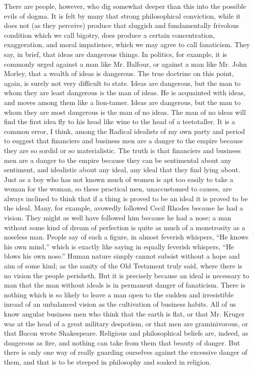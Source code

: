 There are people, however, who dig somewhat deeper than this into the possible evils of dogma. It is felt by many that strong philosophical conviction, while it does not (as they perceive) produce that sluggish and fundamentally frivolous condition which we call bigotry, does produce a certain concentration, exaggeration, and moral impatience, which we may agree to call fanaticism. They say, in brief, that ideas are dangerous things. In politics, for example, it is commonly urged against a man like Mr. Balfour, or against a man like Mr. John Morley, that a wealth of ideas is dangerous. The true doctrine on this point, again, is surely not very difficult to state. Ideas are dangerous, but the man to whom they are least dangerous is the man of ideas. He is acquainted with ideas, and moves among them like a lion-tamer. Ideas are dangerous, but the man to whom they are most dangerous is the man of no ideas. The man of no ideas will find the first idea fly to his head like wine to the head of a teetotaller. It is a common error, I think, among the Radical idealists of my own party and period to suggest that financiers and business men are a danger to the empire because they are so sordid or so materialistic. The truth is that financiers and business men are a danger to the empire because they can be sentimental about any sentiment, and idealistic about any ideal, any ideal that they find lying about. Just as a boy who has not known much of women is apt too easily to take a woman for the woman, so these practical men, unaccustomed to causes, are always inclined to think that if a thing is proved to be an ideal it is proved to be the ideal. Many, for example, avowedly followed Cecil Rhodes because he had a vision. They might as well have followed him because he had a nose; a man without some kind of dream of perfection is quite as much of a monstrosity as a noseless man. People say of such a figure, in almost feverish whispers, “He knows his own mind,” which is exactly like saying in equally feverish whispers, “He blows his own nose.” Human nature simply cannot subsist without a hope and aim of some kind; as the sanity of the Old Testament truly said, where there is no vision the people perisheth. But it is precisely because an ideal is necessary to man that the man without ideals is in permanent danger of fanaticism. There is nothing which is so likely to leave a man open to the sudden and irresistible inroad of an unbalanced vision as the cultivation of business habits. All of us know angular business men who think that the earth is flat, or that Mr. Kruger was at the head of a great military despotism, or that men are graminivorous, or that Bacon wrote Shakespeare. Religious and philosophical beliefs are, indeed, as dangerous as fire, and nothing can take from them that beauty of danger. But there is only one way of really guarding ourselves against the excessive danger of them, and that is to be steeped in philosophy and soaked in religion.

